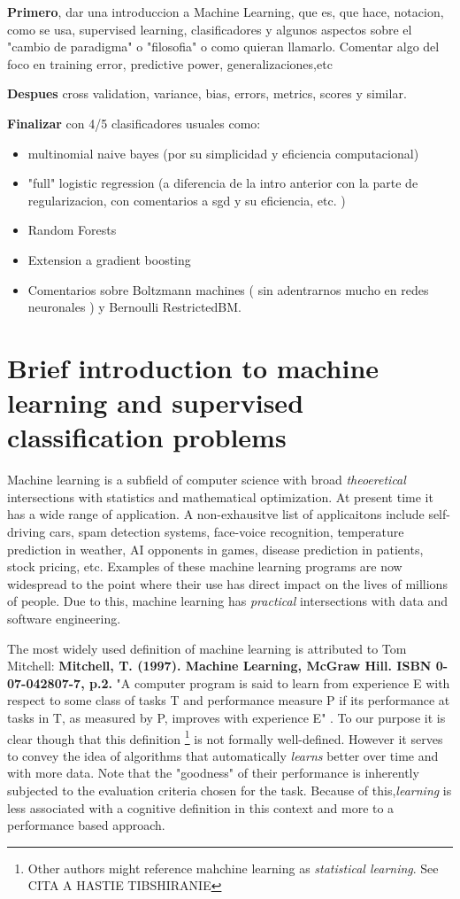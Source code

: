 \textbf{Primero}, dar una introduccion a Machine Learning, que es, que hace, notacion, como se usa, supervised learning, clasificadores y algunos aspectos sobre el "cambio de paradigma" o "filosofia" o como quieran llamarlo. Comentar algo del foco en training error, predictive power, generalizaciones,etc

\textbf{Despues} cross validation, variance, bias, errors, metrics, scores y similar.

\textbf{Finalizar} con 4/5 clasificadores usuales como: 
\begin{itemize}
	\item multinomial naive bayes (por su simplicidad y eficiencia computacional)
	\item "full" logistic regression (a diferencia de la intro anterior con la parte de regularizacion, con comentarios a sgd y su eficiencia, etc. )
	\item Random Forests
	\item Extension a gradient boosting
	\item Comentarios sobre Boltzmann machines ( sin adentrarnos mucho en redes neuronales ) y Bernoulli RestrictedBM.
\end{itemize}

\section{ Brief introduction to machine learning and supervised classification problems}

Machine learning is a subfield of computer science with broad \textit{theoeretical} intersections with statistics and mathematical optimization. At present time it has a wide range of application. A non-exhausitve list of applicaitons include self-driving cars, spam detection systems, face-voice recognition, temperature prediction in weather, AI opponents in games, disease prediction in patients, stock pricing, etc. Examples of these machine learning programs are now widespread to the point where their use has direct impact on the lives of millions of people. Due to this, machine learning has \textit{practical} intersections with data and software engineering.

The most widely used definition of machine learning is attributed to Tom Mitchell: 	\textbf{Mitchell, T. (1997). Machine Learning, McGraw Hill. ISBN 0-07-042807-7, p.2.} 
"A computer program is said to learn from experience E with respect to some class of tasks T and performance measure P if its performance at tasks in T, as measured by P, improves with experience E" . To our purpose it is clear though that this definition \footnote{Other authors might reference mahchine learning as \textit{statistical learning}. See CITA A HASTIE TIBSHIRANIE} is not formally well-defined. However it serves to convey the idea of algorithms that automatically \textit{learns} better over time and with more data. Note that the "goodness" of their performance is inherently subjected to the evaluation criteria chosen for the task. Because of this,\textit{learning} is less associated with a cognitive definition in this context and more to a performance based approach.


